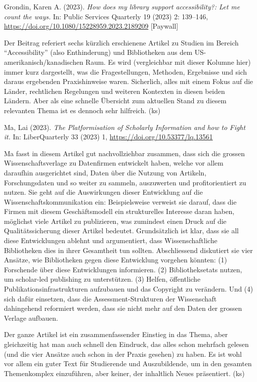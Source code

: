 \documentclass[a4paper,
fontsize=11pt,
oneside,
numbers=noperiodatend,
parskip=half-,
bibliography=totoc,
final
]{scrartcl}
\begin{document}
Grondin, Karen A. (2023). \emph{How does my library support
accessibility?: Let me count the ways.} In: Public Services Quarterly 19
(2023) 2: 139--146, \url{https://doi.org/10.1080/15228959.2023.2189209}
{[}Paywall{]}

Der Beitrag referiert sechs kürzlich erschienene Artikel zu Studien im
Bereich \enquote{Accessibility} (also Enthinderung) und Bibliotheken aus
dem US-amerikanisch/kanadischen Raum. Es wird (vergleichbar mit dieser
Kolumne hier) immer kurz dargestellt, was die Fragestellungen, Methoden,
Ergebnisse und sich daraus ergebenden Praxishinweise waren. Sicherlich,
alles mit einem Fokus auf die Länder, rechtlichen Regelungen und
weiteren Kontexten in diesen beiden Ländern. Aber als eine schnelle
Übersicht zum aktuellen Stand zu diesem relevanten Thema ist es dennoch
sehr hilfreich. (ks)

Ma, Lai (2023). \emph{The Platformisation of Scholarly Information and
how to Fight it.} In: LiberQuarterly 33 (2023) 1,
\url{https://doi.org/10.53377/lq.13561}

Ma fasst in diesem Artikel gut nachvollziehbar zusammen, dass sich die
grossen Wissenschaftsverlage zu Datenfirmen entwickelt haben, welche vor
allem daraufhin ausgerichtet sind, Daten über die Nutzung von Artikeln,
Forschungsdaten und so weiter zu sammeln, auszuwerten und
profitorientiert zu nutzen. Sie geht auf die Auswirkungen dieser
Entwicklung auf die Wissenschaftskommunikation ein: Beispielsweise
verweist sie darauf, dass die Firmen mit diesem Geschäftsmodell ein
strukturelles Interesse daran haben, möglichst viele Artikel zu
publizieren, was zumindest einen Druck auf die Qualitätssicherung dieser
Artikel bedeutet. Grundsätzlich ist klar, dass sie all diese
Entwicklungen ablehnt und argumentiert, dass Wissenschaftliche
Bibliotheken dies in ihrer Gesamtheit tun sollten. Abschliessend
diskutiert sie vier Ansätze, wie Bibliotheken gegen diese Entwicklung
vorgehen könnten: (1) Forschende über diese Entwicklungen informieren.
(2) Bibliotheksetats nutzen, um scholar-led publishing zu unterstützen.
(3) Helfen, öffentliche Publikationsinfrastrukturen aufzubauen und das
Copyright zu verändern. Und (4) sich dafür einsetzen, dass die
Assessment-Strukturen der Wissenschaft dahingehend reformiert werden,
dass sie nicht mehr auf den Daten der grossen Verlage aufbauen.

Der ganze Artikel ist ein zusammenfassender Einstieg in das Thema, aber
gleichzeitig hat man auch schnell den Eindruck, das alles schon mehrfach
gelesen (und die vier Ansätze auch schon in der Praxis gesehen) zu
haben. Es ist wohl vor allem ein guter Text für Studierende und
Auszubildende, um in den gesamten Themenkomplex einzuführen, aber
keiner, der inhaltlich Neues präsentiert. (ks)
\end{document}
